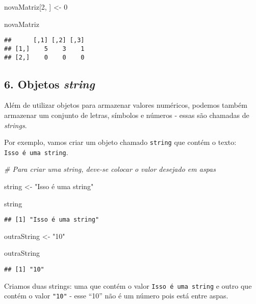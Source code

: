 \documentclass[
]{article}
\newenvironment{Shaded}{\begin{snugshade}}{\end{snugshade}}
\newcommand{\CommentTok}[1]{\textcolor[rgb]{0.56,0.35,0.01}{\textit{#1}}}
\newcommand{\DecValTok}[1]{\textcolor[rgb]{0.00,0.00,0.81}{#1}}
\newcommand{\NormalTok}[1]{#1}
\newcommand{\StringTok}[1]{\textcolor[rgb]{0.31,0.60,0.02}{#1}}
\begin{document}
\begin{Shaded}
\begin{Highlighting}[]
\NormalTok{novaMatriz[}\DecValTok{2}\NormalTok{, ] <-}\StringTok{ }\DecValTok{0}

\NormalTok{novaMatriz}
\end{Highlighting}
\end{Shaded}

\begin{verbatim}
##      [,1] [,2] [,3]
## [1,]    5    3    1
## [2,]    0    0    0
\end{verbatim}

\hypertarget{objetos-string}{%
\subsection{\texorpdfstring{6. Objetos
\emph{string}}{6. Objetos string}}\label{objetos-string}}

Além de utilizar objetos para armazenar valores numéricos, podemos
também armazenar um conjunto de letras, símbolos e números - essas são
chamadas de \emph{strings}.

Por exemplo, vamos criar um objeto chamado \texttt{string} que contém o
texto: \texttt{Isso\ é\ uma\ string}.

\begin{Shaded}
\begin{Highlighting}[]
\CommentTok{# Para criar uma string, deve-se colocar o valor desejado em aspas}

\NormalTok{string <-}\StringTok{ "Isso é uma string"}

\NormalTok{string}
\end{Highlighting}
\end{Shaded}

\begin{verbatim}
## [1] "Isso é uma string"
\end{verbatim}

\begin{Shaded}
\begin{Highlighting}[]
\NormalTok{outraString <-}\StringTok{ "10"}

\NormalTok{outraString}
\end{Highlighting}
\end{Shaded}

\begin{verbatim}
## [1] "10"
\end{verbatim}

Criamos duas strings: uma que contém o valor
\texttt{Isso\ é\ uma\ string} e outro que contém o valor \texttt{"10"} -
esse ``10'' não é um número pois está entre aspas.
\end{document}
